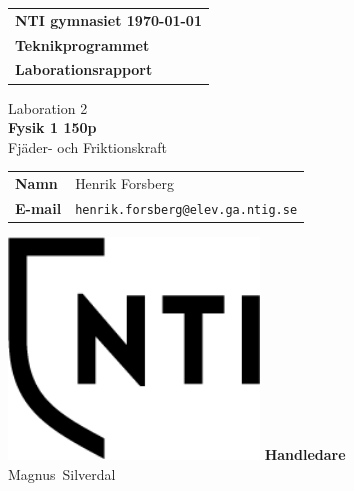 \documentclass[11p, titlepage, oneside, a4paper]{article}
\makeatletter
\def\inst{Teknikprogrammet}
\def\typeofdoc{Laborationsrapport}
\def\course{Fysik 1 150p}
\def\pretitle{Laboration 2}
\def\title{Fjäder- och Friktionskraft}
\def\name{Henrik Forsberg}
\def\username{henrik.forsberg}
\def\email{\username{}@elev.ga.ntig.se}
\def\graders{Magnus Silverdal}
\makeatother
\begin{document}
\begin{titlepage}
		\thispagestyle{empty}
		\begin{large}
			\begin{tabular}{@{}p{\textwidth}@{}}
				\textbf{NTI gymnasiet \hfill \today} \\
				\textbf{\inst} \\
				\textbf{\typeofdoc} \\
			\end{tabular}
		\end{large}
		\vspace{10mm}
		\begin{center}
			\LARGE{\pretitle} \\
			\huge{\textbf{\course}}\\
			\vspace{10mm}
			\LARGE{\title} \\
			\vspace{15mm}
			\begin{large}
				\begin{tabular}{ll}
					\textbf{Namn} & \name \\
					\textbf{E-mail} & \texttt{\email} \\
				\end{tabular}
			\end{large}
			\vfill
            \includegraphics[width=0.5\textwidth]{NTI Gymnasiet_Symbol_print_svart}
			\vfill
            \large{\textbf{Handledare}}\\
			\mbox{\large{\graders}}
		\end{center}
	\end{titlepage}

    \begin{otherlanguage}{english}
	\begin{abstract}
        This paper is about the relation between the spring force and it's length though measuring it with a differing amount of weight. It is also about the relation between the normal force and friction on a block on a tilting plane.
    \end{abstract}
    \end{otherlanguage}
	\tableofcontents
	
\end{document}
